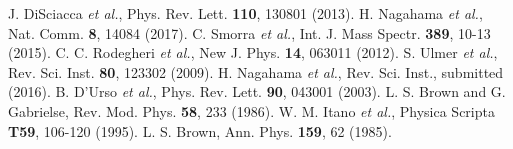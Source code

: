 \documentclass[preprint%
]{elsarticle}
\begin{document}
\begin{thebibliography}{}
 J. DiSciacca \textit{et al.}, Phys. Rev. Lett. \textbf{110}, 130801 (2013).
 H. Nagahama \textit{et al.}, Nat. Comm. \textbf{8}, 14084 (2017).
 C. Smorra \emph{et al.}, Int. J. Mass Spectr. \textbf{389}, 10-13 (2015).
 C. C. Rodegheri \textit{et al.}, New J. Phys. \textbf{14}, 063011 (2012).
 S. Ulmer \emph{et al.}, Rev. Sci. Inst. \textbf{80}, 123302 (2009).
 H. Nagahama \emph{et al.}, Rev. Sci. Inst., submitted (2016).
 B. D'Urso \textit{et al.}, Phys. Rev. Lett. \textbf{90}, 043001 (2003).
 L. S. Brown and G. Gabrielse, Rev. Mod. Phys. \textbf{58}, 233 (1986).
 W. M. Itano \emph{et al.}, Physica Scripta \textbf{T59}, 106-120 (1995).
 L. S. Brown, Ann. Phys. \textbf{159}, 62 (1985).





\end{thebibliography}
\end{document}
